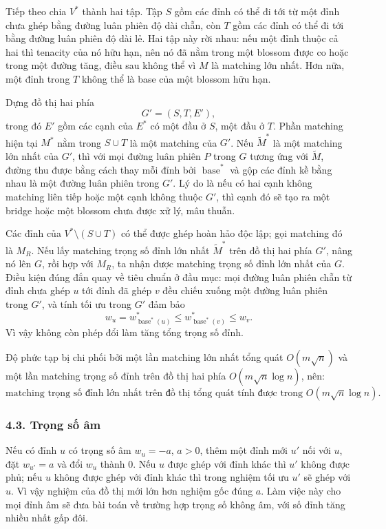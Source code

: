 \documentclass[11pt]{article}
\begin{document}
Tiếp theo chia \(V^*\) thành hai tập. Tập \(S\) gồm các đỉnh có thể đi tới từ
một đỉnh chưa ghép bằng đường luân phiên độ dài chẵn, còn \(T\) gồm các đỉnh
có thể đi tới bằng đường luân phiên độ dài lẻ. Hai tập này rời nhau: nếu một
đỉnh thuộc cả hai thì tenacity của nó hữu hạn, nên nó đã nằm trong một blossom
được co hoặc trong một đường tăng, điều sau không thể vì \(M\) là matching lớn
nhất. Hơn nữa, một đỉnh trong \(T\) không thể là base của một blossom hữu hạn.

Dựng đồ thị hai phía
\[
  G'=(S,T,E'),
\]
trong đó \(E'\) gồm các cạnh của \(E^*\) có một đầu ở \(S\), một đầu ở \(T\).
Phần matching hiện tại \(M^*\) nằm trong \(S\cup T\) là một matching của
\(G'\). Nếu \(\widetilde M^*\) là một matching lớn nhất của \(G'\), thì với
mọi đường luân phiên \(P\) trong \(G\) tương ứng với \(\widetilde M\), đường
thu được bằng cách thay mỗi đỉnh bởi \(\operatorname{base}^*\) và gộp các
đỉnh kề bằng nhau là một đường luân phiên trong \(G'\). Lý do là nếu có hai
cạnh không matching liên tiếp hoặc một cạnh không thuộc \(G'\), thì cạnh đó
sẽ tạo ra một bridge hoặc một blossom chưa được xử lý, mâu thuẫn.

Các đỉnh của \(V^*\setminus(S\cup T)\) có thể được ghép hoàn hảo độc lập; gọi
matching đó là \(M_R\). Nếu lấy matching trọng số đỉnh lớn nhất
\(\widetilde M^*\) trên đồ thị hai phía \(G'\), nâng nó lên \(G\), rồi hợp với
\(M_R\), ta nhận được matching trọng số đỉnh lớn nhất của \(G\). Điều kiện
đúng đắn quay về tiêu chuẩn ở đầu mục: mọi đường luân phiên chẵn từ đỉnh chưa
ghép \(u\) tới đỉnh đã ghép \(v\) đều chiếu xuống một đường luân phiên trong
\(G'\), và tính tối ưu trong \(G'\) đảm bảo
\[
  w_u=w^*_{\operatorname{base}^*(u)}
  \le w^*_{\operatorname{base}^*(v)}
  \le w_v.
\]
Vì vậy không còn phép đổi làm tăng tổng trọng số đỉnh.

Độ phức tạp bị chi phối bởi một lần matching lớn nhất tổng quát
\(O(m\sqrt n)\) và một lần matching trọng số đỉnh trên đồ thị hai phía
\(O(m\sqrt n\log n)\), nên:
\[
  \text{matching trọng số đỉnh lớn nhất trên đồ thị tổng quát tính được trong }
  O(m\sqrt n\log n).
\]

\subsubsection*{4.3. Trọng số âm}

Nếu có đỉnh \(u\) có trọng số âm \(w_u=-a\), \(a>0\), thêm một đỉnh mới
\(u'\) nối với \(u\), đặt \(w_{u'}=a\) và đổi \(w_u\) thành \(0\). Nếu \(u\)
được ghép với đỉnh khác thì \(u'\) không được phủ; nếu \(u\) không được ghép
với đỉnh khác thì trong nghiệm tối ưu \(u'\) sẽ ghép với \(u\). Vì vậy nghiệm
của đồ thị mới lớn hơn nghiệm gốc đúng \(a\). Làm việc này cho mọi đỉnh âm
sẽ đưa bài toán về trường hợp trọng số không âm, với số đỉnh tăng nhiều nhất
gấp đôi.
\end{document}
